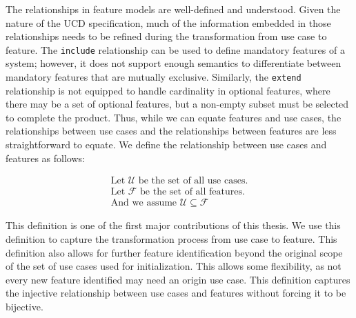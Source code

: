 
The relationships in feature models are well-defined and understood. Given the nature of the \gls{UCD} specification, much of the information embedded in those relationships needs to be refined during the transformation from use case to feature. The \texttt{include} relationship can be used to define mandatory features of a system; however, it does not support enough semantics to differentiate between mandatory features that are mutually exclusive. Similarly, the \texttt{extend} relationship is not equipped to handle cardinality in optional features, where there may be a set of optional features, but a non-empty subset must be selected to complete the product. Thus, while we can equate features and use cases, the relationships between use cases and the relationships between features are less straightforward to equate. We define the relationship between use cases and features as follows:

\begin{gather}
	\label{feat-req_hierarchy}
	\text{Let } \mathcal{U} \text{ be the set of all use cases.}\\
	\text{Let } \mathcal{F} \text{ be the set of all features.}\\
	\text{And we assume } \mathcal{U} \subseteq \mathcal{F} 
\end{gather}

This definition is one of the first major contributions of this thesis. We use this definition to capture the transformation process from use case to feature. This definition also allows for further feature identification beyond the original scope of the set of use cases used for initialization. This allows some flexibility, as not every new feature identified may need an origin use case. This definition captures the injective relationship between use cases and features without forcing it to be bijective.

